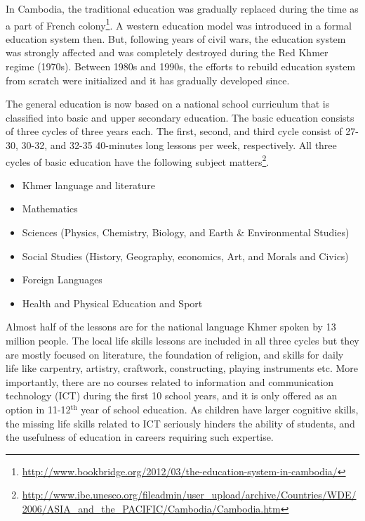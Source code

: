 In Cambodia, the traditional education was gradually replaced during the time as a part of French colony\footnote{\url{http://www.bookbridge.org/2012/03/the-education-system-in-cambodia/}}. A western education model was introduced in a formal education system then. But, following years of civil wars, the education system was strongly affected and was completely destroyed during the Red Khmer regime (1970s). Between 1980s and 1990s, the efforts to rebuild education system from scratch were initialized and it has gradually developed since.


The general education is now based on a national school curriculum that is classified into basic and upper secondary education. The basic education consists of three cycles of three years each. The first, second, and third cycle consist of 27-30, 30-32, and 32-35 40-minutes long lessons per week, respectively. All three cycles of basic education have the following subject matters\footnote{\url{http://www.ibe.unesco.org/fileadmin/user_upload/archive/Countries/WDE/2006/ASIA_and_the_PACIFIC/Cambodia/Cambodia.htm}}.
\begin{itemize}
 \item Khmer language and literature
\item        Mathematics
\item         Sciences (Physics, Chemistry, Biology, and Earth \& Environmental Studies)
\item          Social Studies (History, Geography, economics, Art, and Morals and Civics)
\item     Foreign Languages
\item          Health and Physical Education and Sport

\end{itemize}

Almost half of the lessons are for the national language Khmer spoken by 13 million people. The local life skills lessons are included in all three cycles but they are mostly focused on literature, the foundation of religion, and skills for daily life like carpentry, artistry, craftwork, constructing, playing instruments etc. More importantly, there are no courses related to information and communication technology (ICT) during the first 10 school years, and it is only offered as an option in 11-12$\mathrm{^{th}}$ year of school education. As children have larger cognitive skills, the missing life skills related to ICT seriously hinders the ability of students, and the usefulness of education in careers requiring such expertise.

